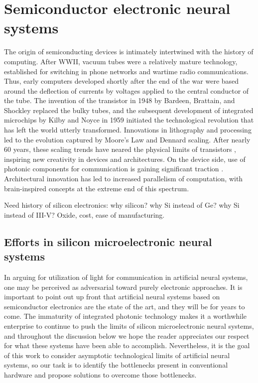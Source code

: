 \documentclass[twocolumn]{article}
\begin{document}
\section{\label{sec:electronics}Semiconductor electronic neural systems}
The origin of semiconducting devices is intimately intertwined with the history of computing. After WWII, vacuum tubes were a relatively mature technology, established for switching in phone networks and wartime radio communications. Thus, early computers developed shortly after the end of the war were based around the deflection of currents by voltages applied to the central conductor of the tube. The invention of the transistor in 1948 by Bardeen, Brattain, and Shockley replaced the bulky tubes, and the subsequent development of integrated microchips by Kilby and Noyce in 1959 initiated the technological revolution that has left the world utterly transformed. Innovations in lithography and processing led to the evolution captured by Moore's Law and Dennard scaling. After nearly 60 years, these scaling trends have neared the physical limits of transistors \cite{}, inspiring new creativity in devices and architectures. On the device side, use of photonic components for communication is gaining significant traction \cite{suwa2015,stra2018}. Architectural innovation has led to increased parallelism of computation, with brain-inspired concepts at the extreme end of this spectrum.

Need history of silicon electronics: why silicon? why Si instead of Ge? why Si instead of III-V? Oxide, cost, ease of manufacturing.

\subsection{Efforts in silicon microelectronic neural systems}
In arguing for utilization of light for communication in artificial neural systems, one may be perceived as adversarial toward purely electronic approaches. It is important to point out up front that artificial neural systems based on semiconductor electronics are the state of the art, and they will be for years to come. The immaturity of integrated photonic technology makes it a worthwhile enterprise to continue to push the limits of silicon microelectronic neural systems, and throughout the discussion below we hope the reader appreciates our respect for what these systems have been able to accomplish. Nevertheless, it is the goal of this work to consider asymptotic technological limits of artificial neural systems, so our task is to identify the bottlenecks present in conventional hardware and propose solutions to overcome those bottlenecks.
\end{document}
